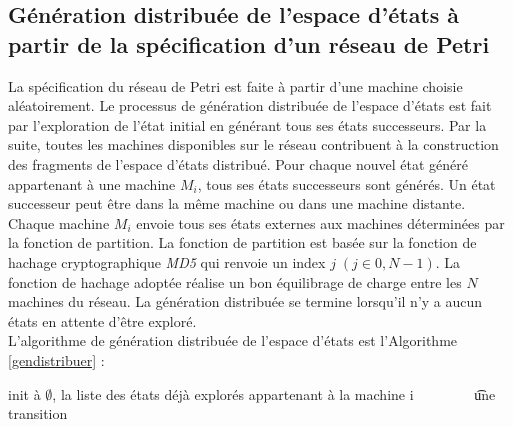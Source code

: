  

\subsection{Génération distribuée de l’espace d’états à partir de la spécification d'un réseau de Petri}{
La spécification du réseau de Petri est faite à partir d'une machine choisie aléatoirement. Le processus de génération distribuée de l'espace d'états est fait par l’exploration de l’état initial en générant tous ses états successeurs. Par la suite, toutes les machines disponibles sur le réseau contribuent à la construction des fragments de l’espace d’états distribué. Pour chaque nouvel état généré appartenant à une machine $M_i$, tous ses états successeurs sont générés. Un état successeur peut être dans la même machine ou dans une machine distante. Chaque machine $M_i$ envoie tous ses états externes aux machines déterminées par la fonction de partition. La fonction de partition est basée sur la fonction de hachage cryptographique \emph{MD5} qui renvoie un index $j\;(j \in 0, N-1)$. La fonction de hachage adoptée réalise un bon équilibrage de charge entre les $N$ machines du réseau.  La génération distribuée se termine lorsqu'il n'y a aucun états en attente d'être exploré.\\
L’algorithme de génération distribuée de l’espace d’états est l'Algorithme \ref{gendistribuer} :\\
\begin{algorithm}
	\SetAlgoLined
	\SetAlgoLined	
	\AlgoDontDisplayBlockMarkers\SetAlgoNoEnd\SetAlgoNoLine%
	\si{init à $\emptyset$, la liste des états déjà explorés appartenant à la machine i }
	\t{une transition}


\end{algorithm}}

